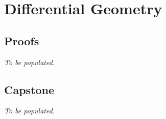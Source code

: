 \chapter{Differential Geometry}

\clearpage

\clearpage

\section*{Proofs}
\textit{To be populated.}

\section*{Capstone}
\textit{To be populated.}
